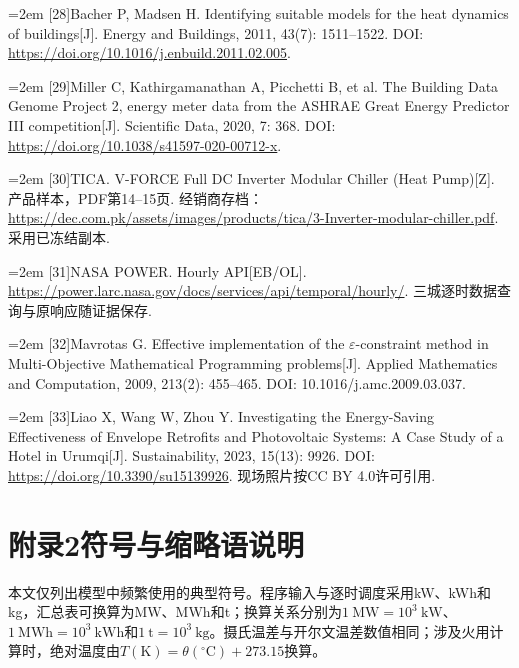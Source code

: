 \documentclass[12pt,a4paper]{article}
\newenvironment{refsectionflush}
  {\par\sloppy\setlength{\parindent}{0pt}\setlength{\parskip}{0pt}}
  {\par\fussy}
\newcommand{\refentry}[2]{%
  \par\noindent\hangindent=2em\hangafter=1
  [#1]\enspace #2\par}
\begin{document}
\begin{refsectionflush}
\refentry{28}{Bacher P, Madsen H. Identifying suitable models for the heat dynamics of buildings{[}J{]}. Energy and Buildings, 2011, 43(7): 1511--1522. DOI: \url{https://doi.org/10.1016/j.enbuild.2011.02.005}.}
\refentry{29}{Miller C, Kathirgamanathan A, Picchetti B, et al. The Building Data Genome Project 2, energy meter data from the ASHRAE Great Energy Predictor III competition{[}J{]}. Scientific Data, 2020, 7: 368. DOI: \url{https://doi.org/10.1038/s41597-020-00712-x}.}
\refentry{30}{TICA. V-FORCE Full DC Inverter Modular Chiller (Heat Pump){[}Z{]}. 产品样本，PDF第14--15页. 经销商存档：\url{https://dec.com.pk/assets/images/products/tica/3-Inverter-modular-chiller.pdf}. 采用已冻结副本.}
\refentry{31}{NASA POWER. Hourly API{[}EB/OL{]}. \url{https://power.larc.nasa.gov/docs/services/api/temporal/hourly/}. 三城逐时数据查询与原响应随证据保存.}
\refentry{32}{Mavrotas G. Effective implementation of the $\varepsilon$-constraint method in Multi-Objective Mathematical Programming problems{[}J{]}. Applied Mathematics and Computation, 2009, 213(2): 455--465. DOI: 10.1016/j.amc.2009.03.037.}
\refentry{33}{Liao X, Wang W, Zhou Y. Investigating the Energy-Saving Effectiveness of Envelope Retrofits and Photovoltaic Systems: A Case Study of a Hotel in Urumqi{[}J{]}. Sustainability, 2023, 15(13): 9926. DOI: \url{https://doi.org/10.3390/su15139926}. 现场照片按CC BY 4.0许可引用.}
\end{refsectionflush}



\begingroup
\let\paperAppendixContents\addcontentsline
\renewcommand{\addcontentsline}[3]{\phantomsection\paperAppendixContents{#1}{#2}{#3}}

\endgroup

\section*{附录2\quad 符号与缩略语说明}
{}

本文仅列出模型中频繁使用的典型符号。程序输入与逐时调度采用kW、kWh和kg，汇总表可换算为MW、MWh和t；换算关系分别为$1~\mathrm{MW}=10^3~\mathrm{kW}$、$1~\mathrm{MWh}=10^3~\mathrm{kWh}$和$1~\mathrm{t}=10^3~\mathrm{kg}$。摄氏温差与开尔文温差数值相同；涉及火用计算时，绝对温度由$T(\mathrm K)=\theta({}^{\circ}\mathrm C)+273.15$换算。
\end{document}
